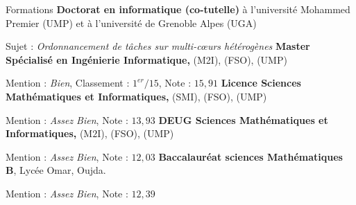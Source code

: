 \begin{rubric}{Formations}
    \entry*[$2016$ -]%
    \textbf{Doctorat en informatique (co-tutelle)} à l'université Mohammed Premier (UMP) et à l'université de Grenoble Alpes (UGA)
	\par Sujet : \emph{Ordonnancement de tâches sur multi-cœurs hétérogènes}
%
\entry*[$2014$]%
	\textbf{Master Spécialisé en Ingénierie Informatique,} (M2I), (FSO), (UMP)\par
	Mention : \emph{Bien}, Classement : $1^{er}/15$, Note : $15,91$ 
%
\entry*[$2012$]%
	\textbf{Licence Sciences Mathématiques et Informatiques,} (SMI), (FSO), (UMP) \par
	Mention : \emph{Assez Bien}, Note :  $13,93$
%
\entry*[$2011$]%
	\textbf{DEUG Sciences Mathématiques et Informatiques,} (M$2$I), (FSO), (UMP)\par
	Mention : \emph{Assez Bien}, Note : $12,03$
%
\entry*[$2008$]%
	\textbf{Baccalauréat sciences Mathématiques B}, Lycée Omar, Oujda.\par
	Mention : \emph{Assez Bien}, Note : $12,39$
%
\end{rubric}
